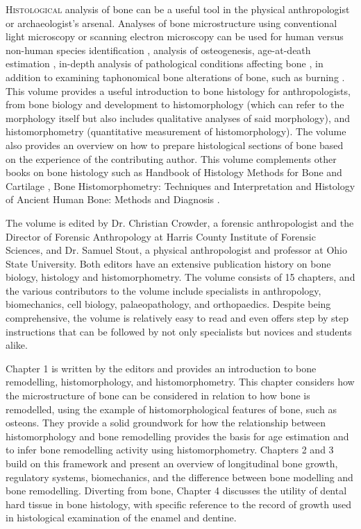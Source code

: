 \lettrine{H}{istological} analysis of bone can be a useful tool in the physical anthropologist or archaeologist’s arsenal. Analyses of bone microstructure using conventional light microscopy or scanning electron microscopy can be used for human versus non-human species identification \parencite{Hillier2007}, analysis of osteogenesis, age-at-death estimation \parencite{Crowder2005}, in-depth analysis of pathological conditions affecting bone \parencite{DeBoer2016}, in addition to examining taphonomical bone alterations of bone, such as burning \parencite{Horocholyn2013,Hollund2012}. This volume provides a useful introduction to bone histology for anthropologists, from bone biology and development to histomorphology (which can refer to the morphology itself but also includes qualitative analyses of said morphology), and histomorphometry (quantitative measurement of histomorphology). The volume also provides an overview on how to prepare histological sections of bone based on the experience of the contributing author. This volume complements other books on bone histology such as Handbook of Histology Methods for Bone and Cartilage \parencite{An2003}, Bone Histomorphometry: Techniques and Interpretation \parencite{Recker1983} and Histology of Ancient Human Bone: Methods and Diagnosis \parencite{Grupe2012}.

The volume is edited by Dr. Christian Crowder, a forensic anthropologist and the Director of Forensic Anthropology at Harris County Institute of Forensic Sciences, and Dr. Samuel Stout, a physical anthropologist and professor at Ohio State University. Both editors have an extensive publication history on bone biology, histology and histomorphometry. The volume consists of 15 chapters, and the various contributors to the volume include specialists in anthropology, biomechanics, cell biology, palaeopathology, and orthopaedics. Despite being comprehensive, the volume is relatively easy to read and even offers step by step instructions that can be followed by not only specialists but novices and students alike.

Chapter 1 is written by the editors and provides an introduction to bone remodelling, histomorphology, and histomorphometry. This chapter considers how the microstructure of bone can be considered in relation to how bone is remodelled, using the example of histomorphological features of bone, such as osteons. They provide a solid groundwork for how the relationship between histomorphology and bone remodelling provides the basis for age estimation and to infer bone remodelling activity using histomorphometry. Chapters 2 and 3 build on this framework and present an overview of longitudinal bone growth, regulatory systems, biomechanics, and the difference between bone modelling and bone remodelling. Diverting from bone, Chapter 4 discusses the utility of dental hard tissue in bone histology, with specific reference to the record of growth used in histological examination of the enamel and dentine.

